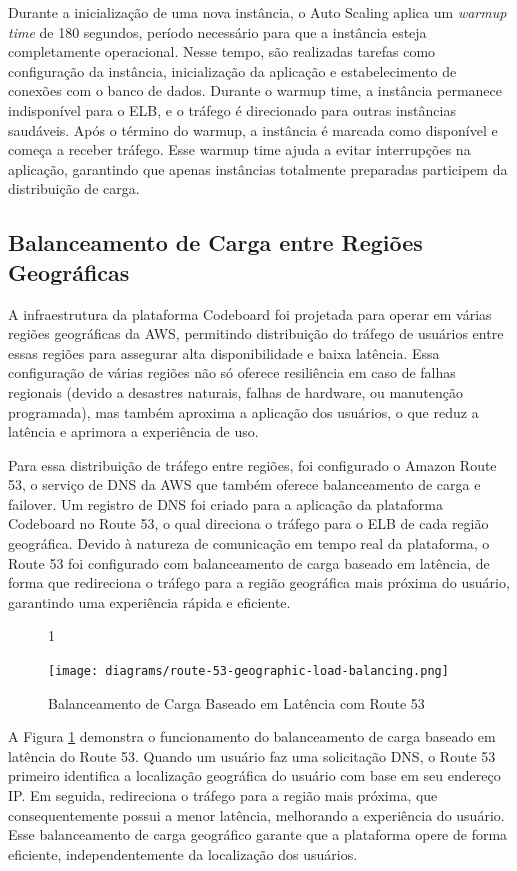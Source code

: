Durante a inicialização de uma nova instância, o Auto Scaling aplica um \emph{warmup time} de 180 segundos, período necessário para que a instância esteja completamente operacional. Nesse tempo, são realizadas tarefas como configuração da instância, inicialização da aplicação e estabelecimento de conexões com o banco de dados. Durante o warmup time, a instância permanece indisponível para o ELB, e o tráfego é direcionado para outras instâncias saudáveis. Após o término do warmup, a instância é marcada como disponível e começa a receber tráfego. Esse warmup time ajuda a evitar interrupções na aplicação, garantindo que apenas instâncias totalmente preparadas participem da distribuição de carga.


\subsection{Balanceamento de Carga entre Regiões Geográficas}

A infraestrutura da plataforma Codeboard foi projetada para operar em várias regiões geográficas da AWS, permitindo distribuição do tráfego de usuários entre essas regiões para assegurar alta disponibilidade e baixa latência. Essa configuração de várias regiões não só oferece resiliência em caso de falhas regionais (devido a desastres naturais, falhas de hardware, ou manutenção programada), mas também aproxima a aplicação dos usuários, o que reduz a latência e aprimora a experiência de uso.

Para essa distribuição de tráfego entre regiões, foi configurado o Amazon Route 53, o serviço de DNS da AWS que também oferece balanceamento de carga e failover. Um registro de DNS foi criado para a aplicação da plataforma Codeboard no Route 53, o qual direciona o tráfego para o ELB de cada região geográfica. Devido à natureza de comunicação em tempo real da plataforma, o Route 53 foi configurado com balanceamento de carga baseado em latência, de forma que redireciona o tráfego para a região geográfica mais próxima do usuário, garantindo uma experiência rápida e eficiente. 

\begin{figure}[H]{1\textwidth}
    \centering
    \caption{Balanceamento de Carga Baseado em Latência com Route 53}
    \label{fig:route-53-geographic-load-balancing}
    \texttt{[image: diagrams/route-53-geographic-load-balancing.png]}
\end{figure}

A Figura \ref{fig:route-53-geographic-load-balancing} demonstra o funcionamento do balanceamento de carga baseado em latência do Route 53. Quando um usuário faz uma solicitação DNS, o Route 53 primeiro identifica a localização geográfica do usuário com base em seu endereço IP. Em seguida, redireciona o tráfego para a região mais próxima, que consequentemente possui a menor latência, melhorando a experiência do usuário. Esse balanceamento de carga geográfico garante que a plataforma opere de forma eficiente, independentemente da localização dos usuários.

